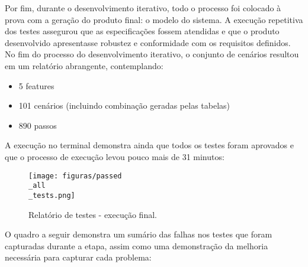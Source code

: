Por fim, durante o desenvolvimento iterativo, todo o processo foi colocado à prova com a geração do produto final: o modelo do sistema. A execução repetitiva dos 
testes assegurou que as especificações fossem atendidas e que o produto desenvolvido apresentasse robustez e conformidade com os requisitos definidos. No fim do 
processo do desenvolvimento iterativo, o conjunto de cenários resultou em um relatório abrangente, contemplando:

\begin{itemize}
    \item 5 features
    \item 101 cenários (incluindo combinação geradas pelas tabelas)
    \item 890 passos
\end{itemize}

A execução no terminal demonstra ainda que todos os testes foram aprovados e que o processo de execução levou pouco mais de 31 minutos:

\begin{figure}[H]
\centering
\texttt{[image: figuras/passed\\\_all\\\_tests.png]}
\caption{Relatório de testes - execução final.}
\end{figure}

O quadro a seguir demonstra um sumário das falhas nos testes que foram capturadas durante a etapa, assim como uma demonstração da melhoria 
necessária para capturar cada problema:

